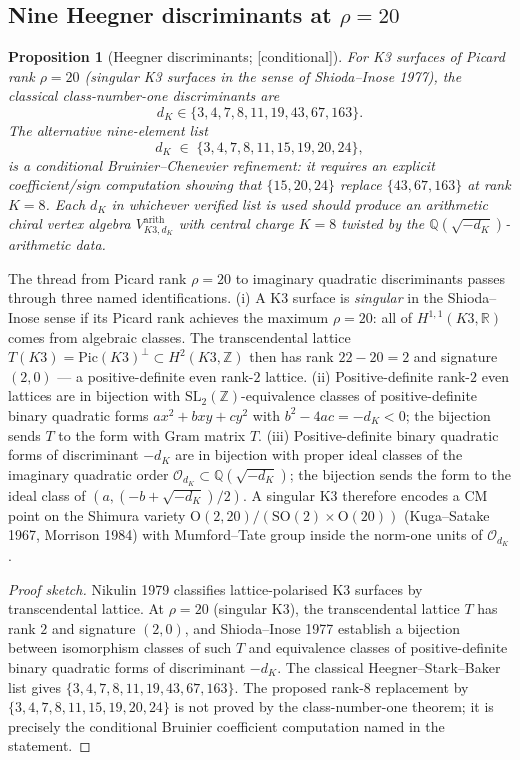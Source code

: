 \documentclass[11pt,reqno]{amsart}
\theoremstyle{plain}
\newtheorem{proposition}[theorem]{Proposition}
\theoremstyle{definition}
\theoremstyle{remark}
\providecommand{\ClaimStatusConditional}{\textnormal{[conditional]}}
\newcommand{\Rbb}{\mathbb{R}}
\newcommand{\Zbb}{\mathbb{Z}}
\newcommand{\Qbb}{\mathbb{Q}}
\newcommand{\cO}{\mathcal{O}}
\begin{document}
\subsection{Nine Heegner discriminants at $\rho = 20$}

\begin{proposition}[Heegner discriminants; \ClaimStatusConditional]
\label{prop:heegner}
For K3 surfaces of Picard rank $\rho = 20$ (singular K3 surfaces in the sense of Shioda--Inose 1977), the classical class-number-one discriminants are
\[
  d_K \in \{3,4,7,8,11,19,43,67,163\}.
\]
The alternative nine-element list
\[
  d_K \;\in\; \{3, 4, 7, 8, 11, 15, 19, 20, 24\},
\]
is a conditional Bruinier--Chenevier refinement: it requires an explicit coefficient/sign computation showing that $\{15,20,24\}$ replace $\{43,67,163\}$ at rank $K=8$. Each $d_K$ in whichever verified list is used should produce an arithmetic chiral vertex algebra $V^{\mathrm{arith}}_{K3,d_K}$ with central charge $K=8$ twisted by the $\Qbb(\sqrt{-d_K})$-arithmetic data.
\end{proposition}

The thread from Picard rank $\rho = 20$ to imaginary quadratic discriminants passes through three named identifications. (i) A K3 surface is \emph{singular} in the Shioda--Inose sense if its Picard rank achieves the maximum $\rho = 20$: all of $H^{1,1}(K3, \Rbb)$ comes from algebraic classes. The transcendental lattice $T(K3) = \mathrm{Pic}(K3)^\perp \subset H^2(K3, \Zbb)$ then has rank $22 - 20 = 2$ and signature $(2, 0)$ --- a positive-definite even rank-$2$ lattice. (ii) Positive-definite rank-$2$ even lattices are in bijection with $\mathrm{SL}_2(\Zbb)$-equivalence classes of positive-definite binary quadratic forms $ax^2 + bxy + cy^2$ with $b^2 - 4ac = -d_K < 0$; the bijection sends $T$ to the form with Gram matrix $T$. (iii) Positive-definite binary quadratic forms of discriminant $-d_K$ are in bijection with proper ideal classes of the imaginary quadratic order $\cO_{d_K} \subset \Qbb(\sqrt{-d_K})$; the bijection sends the form to the ideal class of $(a, (-b + \sqrt{-d_K})/2)$. A singular K3 therefore encodes a CM point on the Shimura variety $\mathrm{O}(2, 20)/(\mathrm{SO}(2) \times \mathrm{O}(20))$ (Kuga--Satake 1967, Morrison 1984) with Mumford--Tate group inside the norm-one units of $\cO_{d_K}$.

\begin{proof}[Proof sketch]
Nikulin 1979 classifies lattice-polarised K3 surfaces by transcendental lattice. At $\rho = 20$ (singular K3), the transcendental lattice $T$ has rank $2$ and signature $(2,0)$, and Shioda--Inose 1977 establish a bijection between isomorphism classes of such $T$ and equivalence classes of positive-definite binary quadratic forms of discriminant $-d_K$. The classical Heegner--Stark--Baker list gives $\{3,4,7,8,11,19,43,67,163\}$. The proposed rank-$8$ replacement by $\{3,4,7,8,11,15,19,20,24\}$ is not proved by the class-number-one theorem; it is precisely the conditional Bruinier coefficient computation named in the statement.
\end{proof}
\end{document}
